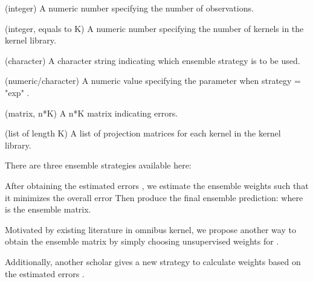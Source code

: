 \documentclass[a4paper]{book}
\begin{document}
%
\begin{Arguments}
\begin{ldescription}
\item[\code{n}] (integer) A numeric number specifying the number of observations.

\item[\code{kern\_size}] (integer, equals to K) A numeric number specifying the
number of kernels in the kernel library.

\item[\code{strategy}] (character) A character string indicating which ensemble
strategy is to be used.

\item[\code{beta\_exp}] (numeric/character) A numeric value specifying the parameter
when strategy = "exp" .

\item[\code{error\_mat}] (matrix, n*K) A n\bsl{}*K matrix indicating errors.

\item[\code{A\_hat}] (list of length K) A list of projection matrices for each
kernel in the kernel library.
\end{ldescription}
\end{Arguments}
%
\begin{Details}\relax
There are three ensemble strategies available here:


After obtaining the estimated errors , we
estimate the ensemble weights  such that it minimizes
the overall error  Then produce the final ensemble prediction:
 where  is the ensemble matrix.


Motivated by existing literature in omnibus kernel, we propose another way
to obtain the ensemble matrix by simply choosing unsupervised weights
 for .


Additionally, another scholar gives a new strategy to calculate weights
based on the estimated errors .
\end{Details}
\end{document}
